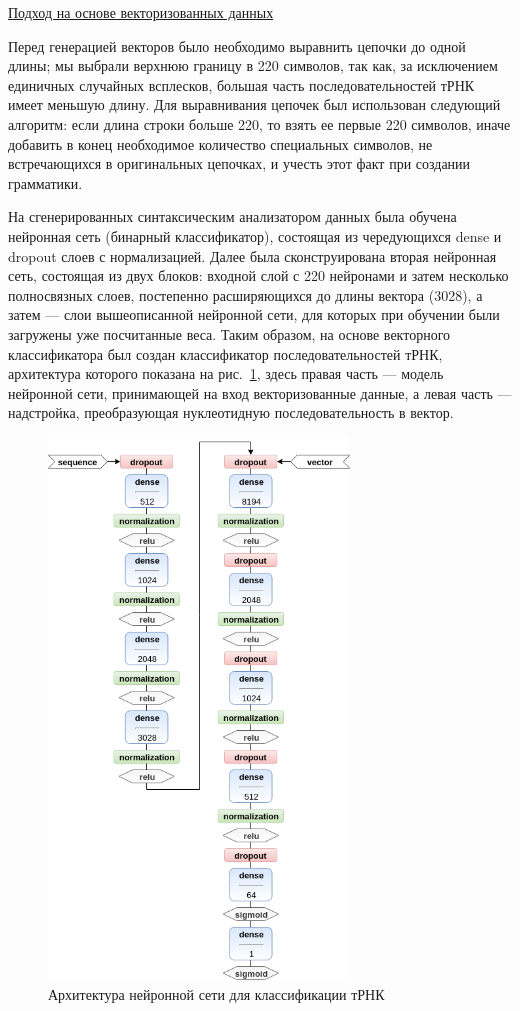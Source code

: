 \documentclass[14pt]{matmex-diploma-custom}
\begin{document}
\vspace{10pt}
\underline{Подход на основе векторизованных данных}

Перед генерацией векторов было необходимо выравнить цепочки до одной длины; мы выбрали верхнюю границу в 220 символов, так как, за исключением единичных случайных всплесков, большая часть последовательностей тРНК имеет меньшую длину. Для выравнивания цепочек был использован следующий алгоритм: если длина строки больше 220, то взять ее первые 220 символов, иначе добавить в конец необходимое количество специальных символов, не встречающихся в оригинальных цепочках, и учесть этот факт при создании грамматики.

На сгенерированных синтаксическим анализатором данных была обучена нейронная сеть (бинарный классификатор), состоящая из чередующихся dense и dropout слоев с нормализацией. Далее была сконструирована вторая нейронная сеть, состоящая из двух блоков: входной слой с 220 нейронами и затем несколько полносвязных слоев, постепенно расширяющихся до длины вектора (3028), а затем --- слои вышеописанной нейронной сети, для которых при обучении были загружены уже посчитанные веса. Таким образом, на основе векторного классификатора был создан классификатор последовательностей тРНК, архитектура которого показана на рис.~\ref{nn1}, здесь правая часть --- модель нейронной сети, принимающей на вход векторизованные данные, а левая часть --- надстройка, преобразующая нуклеотидную последовательность в вектор.

\begin{figure} [h]
\begin{center}
\centering
\includegraphics[width=8cm]{nn.png}
\caption{Архитектура нейронной сети для классификации тРНК}
\label{nn1}
\end{center}
\end{figure}  
\end{document}
